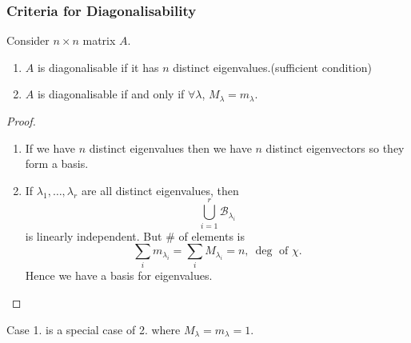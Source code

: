 \documentclass[a4paper]{article}
\begin{document}
    \subsubsection{Criteria for Diagonalisability}
    \begin{proposition}
      Consider $n\times n$ matrix $A$.
      \begin{enumerate}
        \item $A$ is diagonalisable if it has $n$ distinct
          eigenvalues.(sufficient condition)
        \item $A$ is diagonalisable if and only if $ \forall \lambda
          $, $ M_\lambda=m_\lambda $.
      \end{enumerate}
    \end{proposition}
    \begin{proof}
      \begin{enumerate}
        \item If we have $n$ distinct eigenvalues then we have $n$
          distinct eigenvectors so they form a basis.
        \item If $ \lambda_1,\dots,\lambda_r $ are all distinct
          eigenvalues, then
          \[
            \bigcup_{i=1}^{r}\mathcal{B}_{\lambda_i}
          \]
          is linearly independent. But \# of elements is
          \[
            \sum_i m_{\lambda_i}=\sum_i M_{\lambda_i}=n,\ \deg \text{ of } \chi
          .\]
          Hence we have a basis for eigenvalues.
      \end{enumerate}
    \end{proof}
    \begin{remark}
      Case 1. is a special case of 2. where $ M_\lambda=m_\lambda=1 $.
    \end{remark}
\end{document}
